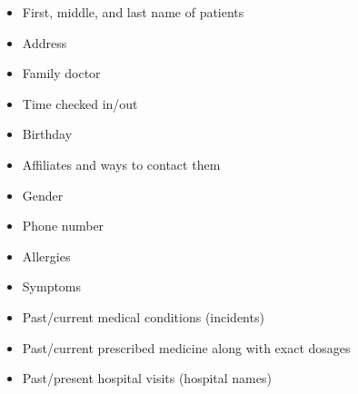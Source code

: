 \documentclass[12pt]{article}
\renewcommand{\_}{\kern-1.5pt\textunderscore\kern-1.5pt}
\begin{document}
\begin{itemize}
	\item First, middle, and last name of patients\par

	\item Address\par

	\item Family doctor\par

	\item Time checked in/out\par

	\item Birthday\par

	\item Affiliates and ways to contact them\par

	\item Gender\par

	\item Phone number\par

	\item Allergies\par

	\item Symptoms\par

	\item Past/current medical conditions (incidents)\par

	\item Past/current prescribed medicine along with exact dosages\par

	\item Past/present hospital visits (hospital names)
\end{itemize}\par
\end{document}
